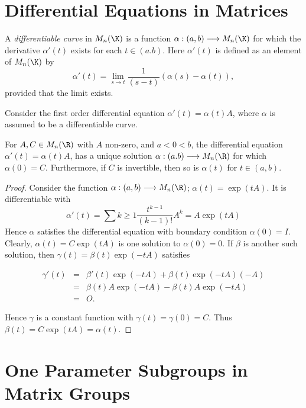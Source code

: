 \section{Differential Equations in Matrices}

\begin{definition}
  A {\it differentiable curve} in \(M_n(\K)\) is a function \(\alpha:(a,b)\longrightarrow M_n(\K)\)
  for which the derivative \(\alpha'(t)\) exists for each \(t\in(a.b)\). Here \(\alpha'(t)\)
  is defined as an element of \(M_n(\K)\) by
  \[ \alpha'(t)=\lim_{s\rightarrow t}\frac{1}{(s-t)}(\alpha(s)-\alpha(t)), \]
  provided that the limit exists.
\end{definition}

Consider the first order differential equation \(\alpha'(t)=\alpha(t)A\), where \(\alpha\)
is assumed to be a differentiable curve.

\begin{theorem}
  For \(A,C\in M_n(\R)\) with \(A\) non-zero, and \(a<0<b\), the differential equation
  \(\alpha'(t)=\alpha(t)A\), has a unique solution \(\alpha:(a.b)\longrightarrow M_n(\R)\)
  for which \(\alpha(0)=C\). Furthermore, if \(C\) is invertible, then so is \(\alpha(t)\) for
  \(t\in(a,b)\).
\label{thm:exp}
\end{theorem}

\begin{proof}
Consider the function \(\alpha:(a,b)\longrightarrow M_n(\R)\); \(\alpha(t)=\exp(tA)\).
It is differentiable with
\[ \alpha'(t)=\sum{k\ge1}\frac{t^{k-1}}{(k-1)!}A^k=A\exp(tA) \]
Hence \(\alpha\) satisfies the differential equation with boundary condition \(\alpha(0)=I\).
Clearly, \(\alpha(t)=C\exp(tA)\) is one solution to \(\alpha(0)=0\). If \(\beta\) is another
such solution, then \(\gamma(t)=\beta(t)\exp(-tA)\) satisfies

\begin{eqnarray*}
  \gamma'(t) &=& \beta'(t)\exp(-tA)+\beta(t)\exp(-tA)(-A) \\
             &=& \beta(t)A\exp(-tA)-\beta(t)A\exp(-tA) \\
             &=& O.
\end{eqnarray*}

Hence \(\gamma\) is a constant function with \(\gamma(t)=\gamma(0)=C\). Thus
\(\beta(t)=C\exp(tA)=\alpha(t)\).
\end{proof}

\section{One Parameter Subgroups in Matrix Groups}

